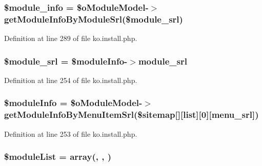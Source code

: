 \subsubsection[{\texorpdfstring{\$module\+\_\+info}{$module_info}}]{\setlength{\rightskip}{0pt plus 5cm}\$module\+\_\+info = \$o\+Module\+Model-\/$>$get\+Module\+Info\+By\+Module\+Srl(\${\bf module\+\_\+srl})}\hypertarget{ko_8install_8php_a5e701819149f6ea0893d4b79010417d3}{}\label{ko_8install_8php_a5e701819149f6ea0893d4b79010417d3}


Definition at line 289 of file ko.\+install.\+php.

\subsubsection[{\texorpdfstring{\$module\+\_\+srl}{$module_srl}}]{\setlength{\rightskip}{0pt plus 5cm}\${\bf module\+\_\+srl} = \$module\+Info-\/$>${\bf module\+\_\+srl}}\hypertarget{ko_8install_8php_ae40aed4d7a99050245e66ca2a82949ed}{}\label{ko_8install_8php_ae40aed4d7a99050245e66ca2a82949ed}


Definition at line 254 of file ko.\+install.\+php.

\subsubsection[{\texorpdfstring{\$module\+Info}{$moduleInfo}}]{\setlength{\rightskip}{0pt plus 5cm}\$module\+Info = \$o\+Module\+Model-\/$>$get\+Module\+Info\+By\+Menu\+Item\+Srl(\$sitemap\mbox{[}\textquotesingle{}\mbox{]}\mbox{[}\textquotesingle{}list\textquotesingle{}\mbox{]}\mbox{[}0\mbox{]}\mbox{[}\textquotesingle{}menu\+\_\+srl\textquotesingle{}\mbox{]})}\hypertarget{ko_8install_8php_ae3552a6dd49f37a50e7858151f7c5cc2}{}\label{ko_8install_8php_ae3552a6dd49f37a50e7858151f7c5cc2}


Definition at line 253 of file ko.\+install.\+php.

\subsubsection[{\texorpdfstring{\$module\+List}{$moduleList}}]{\setlength{\rightskip}{0pt plus 5cm}\$module\+List = array(\textquotesingle{}, \textquotesingle{}, \textquotesingle{})}\hypertarget{ko_8install_8php_aaa80946d50e2d3677fbbc6d6c8a643c3}{}\label{ko_8install_8php_aaa80946d50e2d3677fbbc6d6c8a643c3}


